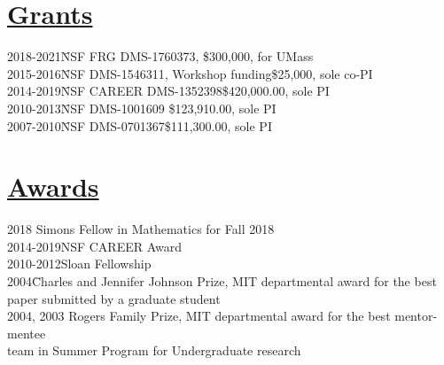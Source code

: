 \documentclass[11pt]{amsart}
\theoremstyle{plain}
\theoremstyle{definition}
\theoremstyle{remark}
\begin{document}
\section*{\Large\underline{Grants}}
\begin{tabbing}
 2018-2021\qquad\quad\=NSF FRG DMS-1760373, \quad\quad\quad\quad \quad\quad\quad\quad \;  \$300,000,  for UMass\\ 
2015-2016\qquad\quad\=NSF DMS-1546311, Workshop funding\quad\quad\quad \$25,000, sole co-PI\\
2014-2019\qquad\quad\=NSF CAREER DMS-1352398\quad\quad\quad\quad\quad\quad\;\;\;\$420,000.00, sole PI\\
2010-2013\qquad\quad\=NSF DMS-1001609\quad\quad
\quad\quad\quad\quad\quad\quad\quad\quad\quad\;\;\$123,910.00, sole PI\\
2007-2010\qquad\quad\=NSF
DMS-0701367\quad\quad\quad\quad\quad\quad\quad\quad\quad\quad\quad\;\;\$111,300.00, sole PI\\
\end{tabbing}

\section*{\Large\underline{Awards}}
\begin{tabbing}
2018  \quad\quad\quad\quad\quad                  Simons Fellow in Mathematics for Fall 2018 \\
2014-2019\quad\quad\quad NSF CAREER Award\\
2010-2012\quad\quad\quad Sloan Fellowship\\
2004\quad\quad\quad\quad\quad\;\= Charles and Jennifer Johnson
Prize, MIT departmental award
 for the best \\ \>paper submitted by a graduate student\\
2004, 2003\> Rogers Family Prize, MIT departmental award   for the
             best mentor-mentee\\ \>team in Summer Program for
             Undergraduate research\\
\end{tabbing}
\end{document}
